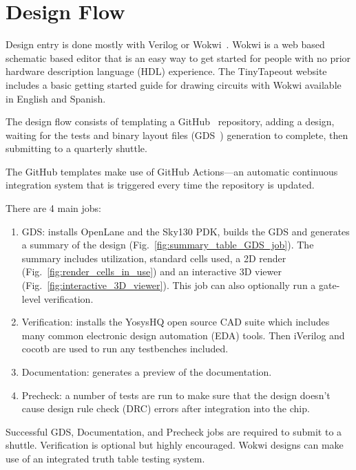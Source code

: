 \section{Design Flow}
\label{sec:design_flow}

Design entry is done mostly with Verilog or Wokwi~\cite{wokwi}.
Wokwi is a web based schematic based editor that is an easy way to get started for people with no prior hardware description language (HDL) experience.
The TinyTapeout website~\cite{tinytapeout} includes a basic getting started guide for drawing circuits with Wokwi available in English and Spanish.

The design flow consists of templating a GitHub~\cite{github} repository, adding a design, waiting for the tests and binary layout files (GDS~\cite{gds}) generation to complete, then submitting to a quarterly shuttle.

The GitHub templates\cite{verilogtemplate} make use of GitHub Actions\cite{githubactions}---an automatic continuous integration system that is triggered every time the repository is updated.

There are 4 main jobs:

\begin{enumerate}
	\item GDS: installs OpenLane\cite{openlane} and the Sky130\cite{skywaterpdk} PDK, builds the GDS and generates a summary of the design (Fig.~\ref{fig:summary_table_GDS_job}). The summary includes utilization, standard cells used, a 2D render (Fig.~\ref{fig:render_cells_in_use}) and an interactive 3D viewer (Fig.~\ref{fig:interactive_3D_viewer}).
This job can also optionally run a gate-level verification.
	\item Verification: installs the YosysHQ open source CAD suite which includes many common electronic design automation (EDA) tools.
Then iVerilog\cite{iverilog} and cocotb\cite{cocotb} are used to run any testbenches included.
	\item Documentation: generates a preview of the documentation.
	\item Precheck: a number of tests are run to make sure that the design doesn’t cause design rule check (DRC) errors after integration into the chip.
\end{enumerate}

Successful GDS, Documentation, and Precheck jobs are required to submit to a shuttle.
Verification is optional but highly encouraged. Wokwi designs can make use of an integrated truth table testing system\cite{automatedtesting}.

